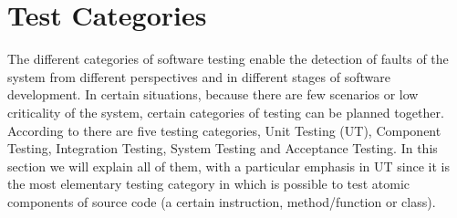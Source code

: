 \section{Test Categories}
The different categories of software testing enable the detection of faults of the system from different perspectives and in different stages
of software development.
In certain situations, because there are few scenarios or low criticality of the system,
certain categories of testing can be planned together. According to \cite{citeulike:453686} there are five testing categories,
Unit Testing (UT), Component Testing, Integration Testing, System Testing and Acceptance Testing.
In this section we will explain all of them, with a particular emphasis in \ac{UT} since it is the most elementary testing category
in which is possible to test atomic components of source code (a certain instruction, method/function or class).\\

